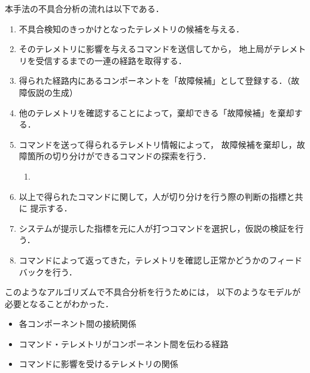 \documentclass[11pt]{article}
\begin{document}
本手法の不具合分析の流れは以下である．
\begin{enumerate}
   \item 不具合検知のきっかけとなったテレメトリの候補を与える．
   \item そのテレメトリに影響を与えるコマンドを送信してから，
   地上局がテレメトリを受信するまでの一連の経路を取得する．
   \item 得られた経路内にあるコンポーネントを「故障候補」として登録する．（故障仮説の生成）
   \item 他のテレメトリを確認することによって，棄却できる「故障候補」を棄却する．
   \item コマンドを送って得られるテレメトリ情報によって，
   故障候補を棄却し，故障箇所の切り分けができるコマンドの探索を行う．
   \begin{enumerate}
      \item 
   \end{enumerate}
   \item 以上で得られたコマンドに関して，人が切り分けを行う際の判断の指標と共に
   提示する．
   \item システムが提示した指標を元に人が打つコマンドを選択し，仮説の検証を行う．
   \item コマンドによって返ってきた，テレメトリを確認し正常かどうかのフィードバックを行う．
\end{enumerate}


このようなアルゴリズムで不具合分析を行うためには，
以下のようなモデルが必要となることがわかった．
\begin{itemize}
   \item 各コンポーネント間の接続関係
   \item コマンド・テレメトリがコンポーネント間を伝わる経路
   \item コマンドに影響を受けるテレメトリの関係
\end{itemize}



\end{document}

